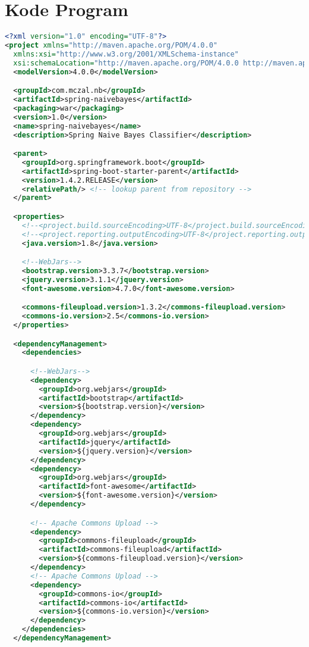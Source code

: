 \section{Kode Program}

\singlespacing

\begin{lstlisting}[language=xml,basicstyle=\tiny,caption=pom.xml]
<?xml version="1.0" encoding="UTF-8"?>
<project xmlns="http://maven.apache.org/POM/4.0.0"
  xmlns:xsi="http://www.w3.org/2001/XMLSchema-instance"
  xsi:schemaLocation="http://maven.apache.org/POM/4.0.0 http://maven.apache.org/xsd/maven-4.0.0.xsd">
  <modelVersion>4.0.0</modelVersion>

  <groupId>com.mczal.nb</groupId>
  <artifactId>spring-naivebayes</artifactId>
  <packaging>war</packaging>
  <version>1.0</version>
  <name>spring-naivebayes</name>
  <description>Spring Naive Bayes Classifier</description>

  <parent>
    <groupId>org.springframework.boot</groupId>
    <artifactId>spring-boot-starter-parent</artifactId>
    <version>1.4.2.RELEASE</version>
    <relativePath/> <!-- lookup parent from repository -->
  </parent>

  <properties>
    <!--<project.build.sourceEncoding>UTF-8</project.build.sourceEncoding>-->
    <!--<project.reporting.outputEncoding>UTF-8</project.reporting.outputEncoding>-->
    <java.version>1.8</java.version>

    <!--WebJars-->
    <bootstrap.version>3.3.7</bootstrap.version>
    <jquery.version>3.1.1</jquery.version>
    <font-awesome.version>4.7.0</font-awesome.version>

    <commons-fileupload.version>1.3.2</commons-fileupload.version>
    <commons-io.version>2.5</commons-io.version>
  </properties>

  <dependencyManagement>
    <dependencies>

      <!--WebJars-->
      <dependency>
        <groupId>org.webjars</groupId>
        <artifactId>bootstrap</artifactId>
        <version>${bootstrap.version}</version>
      </dependency>
      <dependency>
        <groupId>org.webjars</groupId>
        <artifactId>jquery</artifactId>
        <version>${jquery.version}</version>
      </dependency>
      <dependency>
        <groupId>org.webjars</groupId>
        <artifactId>font-awesome</artifactId>
        <version>${font-awesome.version}</version>
      </dependency>

      <!-- Apache Commons Upload -->
      <dependency>
        <groupId>commons-fileupload</groupId>
        <artifactId>commons-fileupload</artifactId>
        <version>${commons-fileupload.version}</version>
      </dependency>
      <!-- Apache Commons Upload -->
      <dependency>
        <groupId>commons-io</groupId>
        <artifactId>commons-io</artifactId>
        <version>${commons-io.version}</version>
      </dependency>
    </dependencies>
  </dependencyManagement>


\end{lstlisting}
